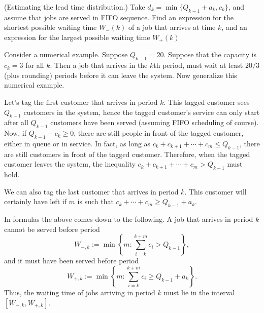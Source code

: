 \begin{exercise}\label{ex:19} (Estimating the lead time distribution.)  Take
  $d_k = \min\{Q_{k-1}+a_k, c_k\}$, and assume that jobs are served in
  FIFO sequence. Find an expression for the shortest possible waiting
  time $W_-(k)$ of a job that arrives at time $k$, and an expression
  for the largest possible waiting time $W_+(k)$
  \begin{hint}
  Consider a numerical example. Suppose $Q_{k-1}=20$. Suppose
    that the capacity is $c_k=3$ for all $k$. Then a job that arrives
    in the $k$th period, must wait at least $20/3$ (plus rounding)
    periods before it can leave the system. Now generalize this
    numerical example.
  \end{hint}
    \begin{solution}
      Let's tag the first customer that arrives in period $k$. This
      tagged customer sees $Q_{k-1}$ customers in the system, hence the
      tagged customer's service can only start after all $Q_{k-1}$
      customers have been served (assuming FIFO scheduling of course).  Now, if $Q_{k-1}-c_k \geq 0$, there are
      still people in front of the tagged customer, either in queue or in service. In fact, as long
      as $c_k+c_{k+1}+\cdots +c_m \leq Q_{k-1}$, there are still customers in
      front of the tagged customer. Therefore, when the tagged customer leaves the system, the inequality $c_k+c_{k+1}+\cdots +c_m > Q_{k-1}$ must hold.

      We can also tag the last customer that arrives in period
      $k$. This customer will certainly have left if $m$ is such that
      $c_k+\cdots+c_m \geq Q_{k-1}+a_k$.

      In formulas the above comes down to the following.  A job that
      arrives in period $k$ cannot be served before period
    \begin{equation*}
    W_{-,k}:= \min\left\{m: \sum_{i=k}^{k+m} c_i > Q_{k-1}\right\},
    \end{equation*}
    and it must have been served before period
    \begin{equation*}
      W_{+,k}:= \min\left\{m: \sum_{i=k}^{k+m} c_i \geq
        Q_{k-1}+a_k\right\}.
    \end{equation*}
    Thus, the waiting time of jobs arriving in period $k$ must lie in
    the interval $[W_{-,k}, W_{+,k}]$.
  \end{solution}
\end{exercise}

